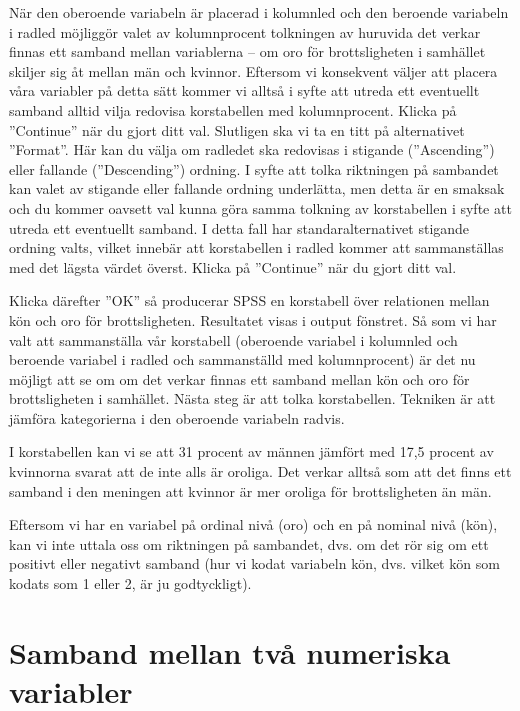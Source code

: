 \documentclass[
]{book}
\begin{document}
När den oberoende variabeln är placerad i kolumnled och den beroende variabeln i radled möjliggör
valet av kolumnprocent tolkningen av huruvida det verkar finnas ett samband mellan variablerna --
om oro för brottsligheten i samhället skiljer sig åt mellan män och kvinnor. Eftersom vi konsekvent
väljer att placera våra variabler på detta sätt kommer vi alltså i syfte att utreda ett eventuellt samband
alltid vilja redovisa korstabellen med kolumnprocent. Klicka på ''Continue'' när du gjort ditt val.
Slutligen ska vi ta en titt på alternativet ''Format''. Här kan du välja om radledet ska redovisas i stigande
(''Ascending'') eller fallande (''Descending'') ordning. I syfte att tolka riktningen på sambandet kan valet
av stigande eller fallande ordning underlätta, men detta är en smaksak och du kommer oavsett val
kunna göra samma tolkning av korstabellen i syfte att utreda ett eventuellt samband. I detta fall har
standaralternativet stigande ordning valts, vilket innebär att korstabellen i radled kommer att
sammanställas med det lägsta värdet överst. Klicka på ''Continue'' när du gjort ditt val.

Klicka därefter ''OK'' så producerar SPSS en korstabell över relationen mellan kön och oro för brottsligheten.
Resultatet visas i output fönstret. Så som vi har valt att sammanställa vår korstabell (oberoende variabel
i kolumnled och beroende variabel i radled och sammanställd med kolumnprocent) är det nu möjligt att
se om om det verkar finnas ett samband mellan kön och oro för brottsligheten i samhället. Nästa steg är
att tolka korstabellen. Tekniken är att jämföra kategorierna i den oberoende variabeln radvis.

I korstabellen kan vi se att 31 procent av männen jämfört med 17,5 procent av kvinnorna svarat att de
inte alls är oroliga. Det verkar alltså som att det finns ett samband i den meningen att kvinnor är mer
oroliga för brottsligheten än män.

Eftersom vi har en variabel på ordinal nivå (oro) och en på nominal nivå (kön), kan vi inte uttala oss om
riktningen på sambandet, dvs. om det rör sig om ett positivt eller negativt samband (hur vi kodat
variabeln kön, dvs. vilket kön som kodats som 1 eller 2, är ju godtyckligt).

\hypertarget{samband-mellan-tvuxe5-numeriska-variabler}{%
\section{Samband mellan två numeriska variabler}\label{samband-mellan-tvuxe5-numeriska-variabler}}
\end{document}
